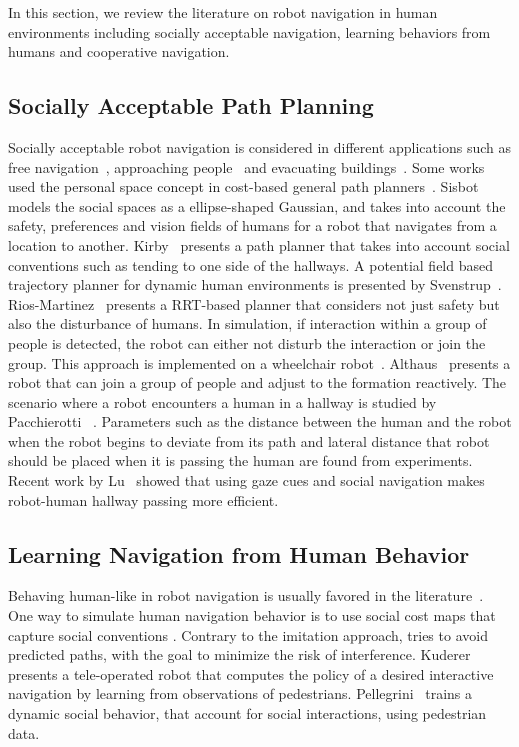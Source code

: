 \documentclass[12pt]{gatech-thesis}
\begin{document}
In this section, we review the literature on robot navigation in human environments including socially acceptable navigation, learning behaviors from humans and cooperative navigation.

\subsection{Socially Acceptable Path Planning}
Socially acceptable robot navigation is considered in different applications such as free navigation~\cite{sisbot2007human}, approaching people~\cite{satake2009approach} and evacuating buildings~\cite{ohki2010collision}. Some works used the personal space concept in cost-based general path planners~\cite{sisbot2007human,kirby2009companion}. Sisbot~\cite{sisbot2007human} models the social spaces as a ellipse-shaped Gaussian, and takes into account the safety, preferences and vision fields of humans for a robot that navigates from a location to another. Kirby~\cite{kirby2009companion} presents a path planner that takes into account social conventions such as tending to one side of the hallways. A potential field based trajectory planner for dynamic human environments is presented by Svenstrup~\cite{svenstrup2010trajectory}. Rios-Martinez~\cite{rios2011understanding} presents a RRT-based planner that considers not just safety but also the disturbance of humans. In simulation, if interaction within a group of people is detected, the robot can either not disturb the interaction or join the group. This approach is implemented on a wheelchair robot~\cite{vasquez2012human}. Althaus~\cite{althaus2004navigation} presents a robot that can join a group of people and adjust to the formation reactively. The scenario where a robot encounters a human in a hallway is studied by Pacchierotti ~\cite{pacchierotti2005human}. Parameters such as the distance between the human and the robot when the robot begins to deviate from its path and lateral distance that robot should be placed when it is passing the human are found from experiments. Recent work by Lu~\cite{lu2013towards} showed that using gaze cues and social navigation makes robot-human hallway passing more efficient.

\subsection{Learning Navigation from Human Behavior}

Behaving human-like in robot navigation is usually favored in the literature~\cite{sasaki2006human}. One way to simulate human navigation behavior is to use social cost maps that capture social conventions \cite{scandolo2011anthropomorphic,luber2012socially}. Contrary to the imitation approach, \cite{bennewitz2005learning} tries to avoid predicted paths, with the goal to minimize the risk of interference. Kuderer~\cite{kuderer2013teaching} presents a tele-operated robot that computes the policy of a desired interactive navigation by learning from observations of pedestrians. Pellegrini~\cite{pellegrini2009you} trains a dynamic social behavior, that account for social interactions, using pedestrian data.
\end{document}
